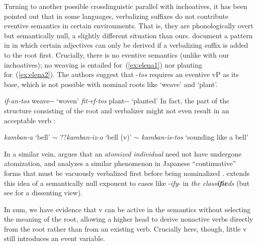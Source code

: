\begin{exe}
\begin{xlist}
\begin{xlist}
\begin{exe}
\begin{xlist}
\begin{xlist}
\begin{exe}
\begin{xlist}
\begin{xlist}
\begin{exe}
\begin{exe}
\begin{xlist}
\begin{exe}
\begin{exe}
\begin{xlist}
\begin{exe}
\begin{exe}
\begin{exe}
\begin{exe}
\begin{exe}
\begin{xlist}
\begin{exe}
\begin{xlist}
\begin{exe}
\begin{exe}
\begin{xlist}
\begin{exe}
\begin{xlist}
\begin{exe}
\begin{xlist}
\begin{exe}
\begin{exe}
\begin{exe}
\begin{xlist}
\begin{exe}
\begin{exe}
\begin{exe}
\begin{xlist}
\begin{exe}
\begin{xlist}
\begin{exe}
\begin{exe}
\begin{xlist}
Turning to another possible crosslinguistic parallel with inchoatives, it has been pointed out that in some languages, verbalizing suffixes do not contribute eventive semantics in certain environments. That is, they are phonologically overt but semantically null, a slightly different situation than ours. \citet{elenasamioti13,elenasamioti14} document a pattern in  in which certain adjectives can only be derived if a verbalizing suffix is added to the root first. Crucially, there is no eventive semantics (unlike with our inchoatives); no weaving is entailed for~(\ref{ex:elena1}) nor planting for~(\ref{ex:elena2}). {The authors suggest that -\emph{tos} requires an eventive vP as its base, which is not possible with nominal roots like `weave' and `plant'.}
 \begin{exe}
\ex  \label{ex:elena1} \emph{if-an-tos} weave-- `woven' 
\ex  \label{ex:elena2} \emph{fit-ef-tos} plant-- `planted' \hfill \citep[97]{elenasamioti14} 
 \z 
In fact, the part of the structure consisting of the root and verbalizer might not even result in an acceptable verb \citep[100]{elenasamioti14}:

 \begin{exe}
\ex  \emph{kamban-a} `bell' $\sim$ ??\emph{kamban-iz-o} `bell (v)' $\sim$ \emph{kamban-is-tos} `sounding like a bell' 
 \z 

In a similar vein, \cite{marantz13} argues that an \emph{atomized individual} need not have undergone atomization, and analyzes a similar phenomenon in Japanese ``continuative'' forms that must be vacuously verbalized first{ before being nominalized} \citep{volpe05}. \cite{anagnostopoulou14thli} extends this idea of a semantically null exponent to cases like -\emph{ify}- in \emph{the class\textbf{ifie}ds} (but see \citealt{borer14lingua} for a dissenting view).

In sum, we have evidence that v can be active in the semantics without selecting the meaning of the root, allowing a higher {\vz} head to derive nonactive verbs directly from the root rather than from an existing verb. Crucially here, though, little v still introduces an event variable.

	

\end{exe}
\end{exe}
\end{xlist}
\end{exe}
\end{exe}
\end{xlist}
\end{exe}
\end{xlist}
\end{exe}
\end{exe}
\end{exe}
\end{xlist}
\end{exe}
\end{exe}
\end{exe}
\end{xlist}
\end{exe}
\end{xlist}
\end{exe}
\end{xlist}
\end{exe}
\end{exe}
\end{xlist}
\end{exe}
\end{xlist}
\end{exe}
\end{exe}
\end{exe}
\end{exe}
\end{exe}
\end{xlist}
\end{exe}
\end{exe}
\end{xlist}
\end{exe}
\end{exe}
\end{xlist}
\end{xlist}
\end{exe}
\end{xlist}
\end{xlist}
\end{exe}
\end{xlist}
\end{xlist}
\end{exe}
